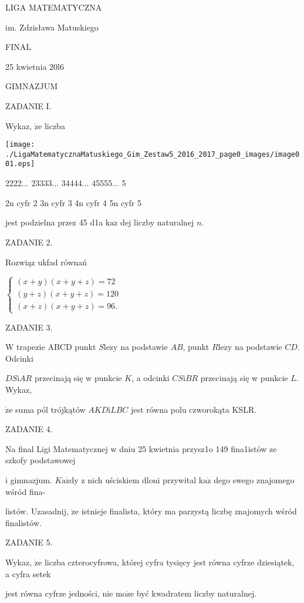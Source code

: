 \documentclass[a4paper,12pt]{article}
\begin{document}
LIGA MATEMATYCZNA

im. Zdzisława Matuskiego

FINAL

25 kwietnia 20l6

GIMNAZJUM

ZADANIE I.

Wykaz, $\dot{\mathrm{z}}\mathrm{e}$ liczba
\begin{center}
\texttt{[image: ./LigaMatematycznaMatuskiego\_Gim\_Zestaw5\_2016\_2017\_page0\_images/image001.eps]}
\end{center}
2222$\ldots$ 23333$\ldots$ 34444$\ldots$ 45555$\ldots$ 5

2n cyfr 2 3n cyfr 3  4n cyfr 4 5n cyfr 5

jest podzielna przez 45 d1a $\mathrm{k}\mathrm{a}\dot{\mathrm{z}}$ dej liczby naturalnej $n.$

ZADANIE 2.

Rozwiąz ukfad równań

$\left\{\begin{array}{l}
(x+y)(x+y+z)=72\\
(y+z)(x+y+z)=120\\
(x+z)(x+y+z)=96.
\end{array}\right.$

ZADANIE 3.

$\mathrm{W}$ trapezie ABCD punkt $S\mathrm{l}\mathrm{e}\dot{\mathrm{z}}\mathrm{y}$ na podstawie $AB$, punkt $R\mathrm{l}\mathrm{e}\dot{\mathrm{z}}\mathrm{y}$ na podstawie $CD$. Odcinki

$DS\mathrm{i}AR$ przecinają się w punkcie $K$, a odcinki $CS\mathrm{i}BR$ przecinają się w punkcie $L$. Wykaz,

$\dot{\mathrm{z}}\mathrm{e}$ suma pól trójkątów $AKD\mathrm{i}LBC$ jest równa polu czworokąta KSLR.

ZADANIE 4.

Na final Ligi Matematycznej w dniu 25 kwietnia przysz1o 149 fina1istów ze szkofy podstawowej

i gimnazjum. $K\mathrm{a}\dot{\mathrm{z}}\mathrm{d}\mathrm{y}$ z nich uściskiem dloni przywital $\mathrm{k}\mathrm{a}\dot{\mathrm{z}}$ dego swego znajomego wśród fina-

listów. Uzasadnij, $\dot{\mathrm{z}}\mathrm{e}$ istnieje finalista, który ma parzystą liczbę znajomych wśród finalistów.

ZADANIE 5.

Wykaz, $\dot{\mathrm{z}}\mathrm{e}$ liczba czterocyfrowa, której cyfra tysięcy jest równa cyfrze dziesiątek, a cyfra setek

jest równa cyfrze jedności, nie $\mathrm{m}\mathrm{o}\dot{\mathrm{z}}\mathrm{e}$ być kwadratem liczby naturalnej.
\end{document}
